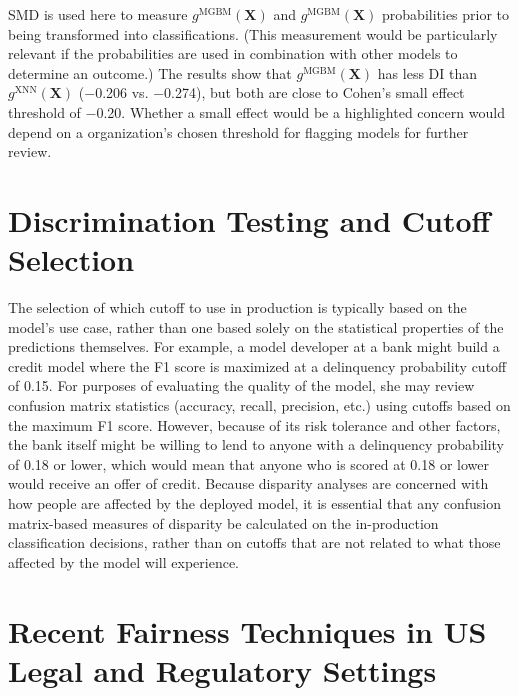 \documentclass[information,article,accept,moreauthors,pdftex]{Definitions/mdpi}
\begin{document}
{SMD is used here to measure $g^\text{MGBM}(\mathbf{X})$ and $g^\text{MGBM}(\mathbf{X})$ probabilities prior to being transformed into classifications.  (This measurement would be particularly relevant if the probabilities are used in combination with other models to determine an outcome.)  The results show that $g^\text{MGBM}(\mathbf{X})$ has less DI than $g^\text{XNN}(\mathbf{X})$ ($-$0.206 vs. $-$0.274), but both are close to Cohen’s small effect threshold of $-$0.20. Whether a small effect would be a highlighted concern would depend on a organization’s chosen threshold for flagging models for further review. 

\section{Discrimination Testing and Cutoff Selection}\label{a_sec:cut}

The selection of which cutoff to use in production is typically based on the model’s use case, rather than one based solely on the statistical properties of the predictions themselves.  For example, a model developer at a bank might build a credit model where the F1 score is maximized at a delinquency probability cutoff of 0.15.  For purposes of evaluating the quality of the model, she may review confusion matrix statistics (accuracy, recall, precision, etc.) using cutoffs based on the maximum F1 score. However, because of its risk tolerance and other factors, the bank itself might be willing to lend to anyone with a delinquency probability of 0.18 or lower, which would mean that anyone who is scored at 0.18 or lower would receive an offer of credit.  Because disparity analyses are concerned with how people are affected by the deployed model, it is essential that any confusion matrix-based measures of disparity be calculated on the in-production classification decisions, rather than on cutoffs that are not related to what those affected by the model will experience.

\section{Recent Fairness Techniques in US Legal and Regulatory Settings}\label{a_sec:comp}

}
\end{document}
